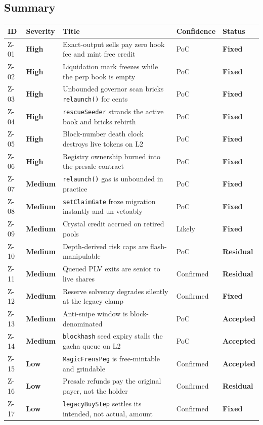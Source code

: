 \documentclass[10pt,a4paper]{article}
\newcommand{\sev}[2]{\textcolor{#1}{\textbf{#2}}}
\newcommand{\SevHigh}{\sev{high}{High}}
\newcommand{\SevMed}{\sev{med}{Medium}}
\newcommand{\SevLow}{\sev{low}{Low}}
\newcommand{\Fixed}{\textcolor{ok}{\textbf{Fixed}}}
\newcommand{\Residual}{\textcolor{med}{\textbf{Residual}}}
\newcommand{\Accepted}{\textcolor{info}{\textbf{Accepted}}}
\newcommand{\code}[1]{\texttt{\small #1}}
\begin{document}
\subsection*{Summary}
\begin{center}\small
\begin{tabular}{@{}llp{7.4cm}ll@{}}
\toprule
\textbf{ID} & \textbf{Severity} & \textbf{Title} & \textbf{Confidence} & \textbf{Status} \\
\midrule
Z-01 & \SevHigh & Exact-output sells pay zero hook fee and mint free credit & PoC & \Fixed \\
Z-02 & \SevHigh & Liquidation mark freezes while the perp book is empty & PoC & \Fixed \\
Z-03 & \SevHigh & Unbounded governor scan bricks \code{relaunch()} for cents & PoC & \Fixed \\
Z-04 & \SevHigh & \code{rescueSeeder} strands the active book and bricks rebirth & PoC & \Fixed \\
Z-05 & \SevHigh & Block-number death clock destroys live tokens on L2 & PoC & \Fixed \\
Z-06 & \SevHigh & Registry ownership burned into the presale contract & PoC & \Fixed \\
Z-07 & \SevMed & \code{relaunch()} gas is unbounded in practice & PoC & \Fixed \\
Z-08 & \SevMed & \code{setClaimGate} froze migration instantly and un-vetoably & PoC & \Fixed \\
Z-09 & \SevMed & Crystal credit accrued on retired pools & Likely & \Fixed \\
Z-10 & \SevMed & Depth-derived risk caps are flash-manipulable & PoC & \Residual \\
Z-11 & \SevMed & Queued PLV exits are senior to live shares & Confirmed & \Residual \\
Z-12 & \SevMed & Reserve solvency degrades silently at the legacy clamp & Confirmed & \Fixed \\
Z-13 & \SevMed & Anti-snipe window is block-denominated & PoC & \Accepted \\
Z-14 & \SevMed & \code{blockhash} seed expiry stalls the gacha queue on L2 & PoC & \Accepted \\
Z-15 & \SevLow & \code{MagicFrensPeg} is free-mintable and grindable & Confirmed & \Accepted \\
Z-16 & \SevLow & Presale refunds pay the original payer, not the holder & Confirmed & \Residual \\
Z-17 & \SevLow & \code{legacyBuyStep} settles its intended, not actual, amount & Confirmed & \Fixed \\

\end{tabular}
\end{center}
\end{document}
